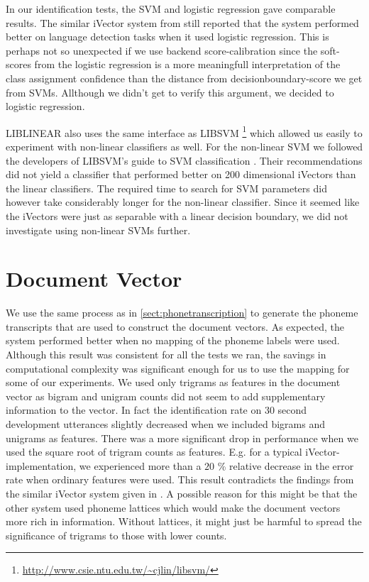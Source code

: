 In our identification tests, the SVM and logistic regression gave comparable results. The similar iVector system from \cite{lrivector} still reported that the system performed better on language detection tasks when it used logistic regression. This is perhaps not so unexpected if we use backend score-calibration since the soft-scores from the logistic regression is a more meaningfull interpretation of the class assignment confidence than the distance from decisionboundary-score we get from SVMs. Allthough we didn't get to verify this argument, we decided to logistic regression.

LIBLINEAR also uses the same interface as LIBSVM \footnote{\url{http://www.csie.ntu.edu.tw/~cjlin/libsvm/}} which allowed us easily to experiment with non-linear classifiers as well. For the non-linear SVM we followed the developers of LIBSVM's guide to SVM classification \cite{practicalsvm}. Their recommendations did not yield a classifier that performed better on 200 dimensional iVectors than the linear classifiers. The required time to search for SVM parameters did however take considerably longer for the non-linear classifier. Since it seemed like the iVectors were just as separable with a linear decision boundary, we did not investigate using non-linear SVMs further. 

\section{Document Vector}

We use the same process as in \ref{sect:phonetranscription} to generate the phoneme transcripts that are used to construct the document vectors. As expected, the system performed better when no mapping of the phoneme labels were used. Although this result was consistent for all the tests we ran, the savings in computational complexity was significant enough for us to use the mapping for some of our experiments. We used only trigrams as features in the document vector as bigram and unigram counts did not seem to add supplementary information to the vector. In fact the identification rate on 30 second development utterances slightly decreased when we included bigrams and unigrams as features. There was a more significant drop in performance when we used the square root of trigram counts as features. E.g. for a typical iVector-implementation, we experienced more than a $20$ \% relative decrease in the error rate when ordinary features were used. This result contradicts the findings from the similar iVector system given in \cite{lrivector}. A possible reason for this might be that the other system used phoneme lattices which would make the document vectors more rich in information. Without lattices, it might just be harmful to spread the significance of trigrams to those with lower counts.

